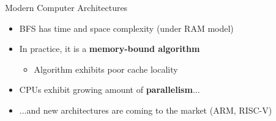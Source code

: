 \begin{frame}{Modern Computer Architectures}
\begin{itemize}
    \item BFS has  time and space complexity (under RAM model)
    \item<2-> In practice, it is a \textbf{memory-bound algorithm} %
    \begin{itemize}
        \item Algorithm exhibits poor cache locality
    \end{itemize}
    \item<3-> CPUs exhibit growing amount of \textbf{parallelism}...
    \item<4-> ...and new architectures are coming to the market (ARM, RISC-V)
\end{itemize}
\end{frame}

